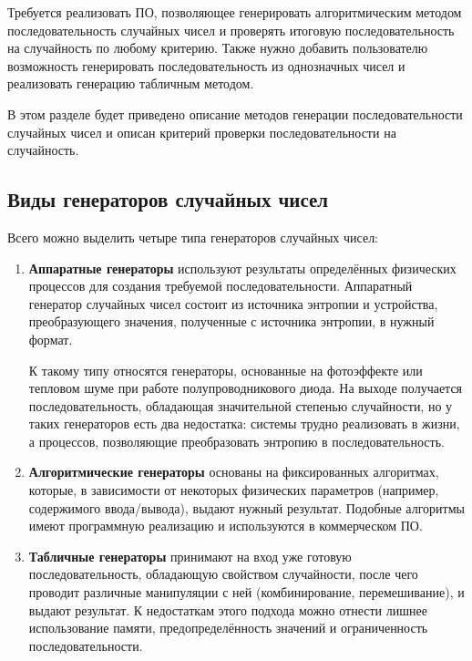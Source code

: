 Требуется реализовать ПО, позволяющее генерировать алгоритмическим методом последовательность случайных чисел и проверять итоговую последовательность на случайность по любому критерию.
Также нужно добавить пользователю возможность генерировать последовательность из однозначных чисел и реализовать генерацию табличным методом.

В этом разделе будет приведено описание методов генерации последовательности случайных чисел и описан критерий проверки последовательности на случайность.

\subsection*{Виды генераторов случайных чисел}
Всего можно выделить четыре типа генераторов случайных чисел:
\begin{enumerate}
	\item \textbf{Аппаратные генераторы} используют результаты определённых физических процессов для создания требуемой последовательности. Аппаратный генератор случайных чисел состоит из источника энтропии и устройства, преобразующего значения, полученные с источника энтропии, в нужный формат.
	
	К такому типу относятся генераторы, основанные на фотоэффекте или тепловом шуме при работе полупроводникового диода. 
	На выходе получается последовательность, обладающая значительной степенью случайности, но у таких генераторов есть два недостатка: системы трудно реализовать в жизни, а процессов, позволяющие преобразовать энтропию в последовательность.
	
	\item \textbf{Алгоритмические генераторы} основаны на фиксированных алгоритмах, которые, в зависимости от некоторых физических параметров (например, содержимого ввода/вывода), выдают нужный результат. Подобные алгоритмы имеют программную реализацию и используются в коммерческом ПО.
	
	\item \textbf{Табличные генераторы} принимают на вход уже готовую последовательность, обладающую свойством случайности, после чего проводит различные манипуляции с ней (комбинирование, перемешивание), и выдают результат.
	К недостаткам этого подхода можно отнести лишнее использование памяти, предопределённость значений и ограниченность последовательности.
\end{enumerate}

